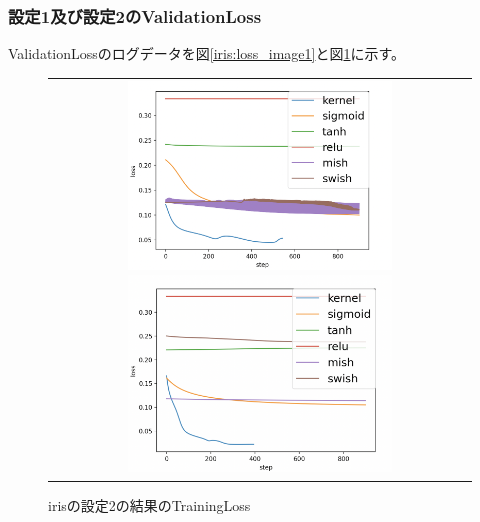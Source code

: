 \subsubsection{設定1及び設定2のValidationLoss}
\label{iris:loss}


ValidationLossのログデータを図\ref{iris:loss_image1}と図\ref{iris:loss_image2}に示す。

\begin{figure}[hbtp]
    \begin{center}
        \begin{tabular}{c}
            \begin{minipage}{0.5\hsize}
                \includegraphics[clip, width=7cm]{asset/iris_0.1_1000_3_02_sgd_non_kaiming_uniform.png}
                    \caption{irisの設定1の結果のTrainingLoss}
                    \label{iris:loss_image1}
            \end{minipage}
            \hspace{10pt}
            \begin{minipage}{0.5\hsize}
                \includegraphics[clip, width=7cm]{asset/iris_0.1_1000_3_02_sgd_l2_kaiming_uniform.png}
                    \caption{irisの設定2の結果のTrainingLoss}
                    \label{iris:loss_image2}
            \end{minipage}
        \end{tabular}
    \end{center}
\end{figure}


